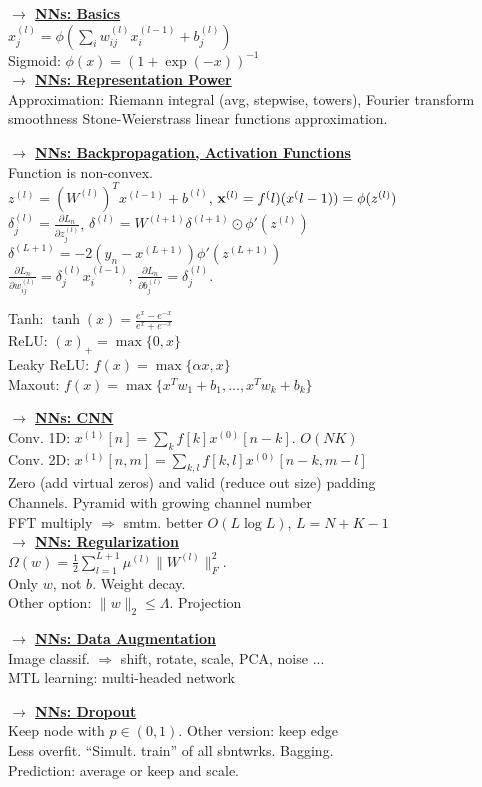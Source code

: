 \documentclass[11pt]{article}
\newcommand{\myvector}[1]{{\bf{#1}}}
\newcommand{\x}{\myvector{x}}
\newcommand{\mytitle}[1]{ {\bf $\rightarrow$ \underline{#1}}\\}
\begin{document}
\begin{multicols*}{2}
\mytitle{NNs: Basics}
$x_j^{(l)}=\phi\left(\sum\limits_iw_{ij}^{(l)}x_i^{(l-1)}+b_j^{(l)}\right)$\\
Sigmoid: $\phi(x)=(1+\exp(-x))^{-1}$\\

\mytitle{NNs: Representation Power}
Approximation: Riemann integral (avg, stepwise, towers), Fourier transform smoothness
Stone-Weierstrass linear functions approximation.

\mytitle{NNs: Backpropagation, Activation Functions}
Function is non-convex.\\
$z^({l})=(W^{(l)})^Tx^{(l-1)}+b^{(l)}$, $\x^{(l)}=f^({l})(x^({l-1}))=\phi(z^{(l)})$\\
$\delta_j^{(l)}=\frac{\partial L_n}{\partial z_j^{(l)}}$, $\delta^{(l)}=W^{(l+1)}\delta^{(l+1)}\odot \phi'(z^{(l)})$\\
$\delta^{(L+1)}=-2(y_n-x^{(L+1)})\phi'(z^{(L+1)})$\\
$\frac{\partial L_n}{\partial w_{ij}^{(l)}}=\delta^{(l)}_jx_i^{(l-1)}$,
$\frac{\partial L_n}{\partial b_{j}^{(l)}}=\delta^{(l)}_j$.

Tanh: $\tanh(x)=\frac{e^x-e^{-x}}{e^x+e^{-x}}$\\
ReLU: $(x)_+=\max\{0, x\}$\\
Leaky ReLU: $f(x)=\max\{\alpha x, x\}$\\
Maxout: $f(x)=\max\{x^Tw_1+b_1,...,x^Tw_k+b_k\}$

\mytitle{NNs: CNN}
Conv. 1D: $x^{(1)}[n]=\sum\limits_kf[k]x^{(0)}[n-k]$. $O(NK)$\\
Conv. 2D: $x^{(1)}[n,m]=\sum\limits_{k,l}f[k,l]x^{(0)}[n-k,m-l]$\\
Zero (add virtual zeros) and valid (reduce out size) padding\\
Channels. Pyramid with growing channel number\\
FFT multiply $\Rightarrow$ smtm. better $O(L\log L)$, $L=N+K-1$\\

\mytitle{NNs: Regularization}
$\Omega(w)=\frac{1}{2}\sum\limits_{l=1}^{L+1}\mu^{(l)}\|W^{(l)}\|_F^2$.\\
Only $w$, not $b$. Weight decay.\\
Other option: $\|w\|_2\leqslant \Lambda$. Projection

\mytitle{NNs: Data Augmentation}
Image classif. $\Rightarrow$ shift, rotate, scale, PCA, noise ...\\
MTL learning: multi-headed network

\mytitle{NNs: Dropout}
Keep node with $p\in(0,1)$. Other version: keep edge\\
Less overfit. ``Simult. train'' of all sbntwrks. Bagging.\\
Prediction: average or keep and scale.


\end{multicols*}
\end{document}

